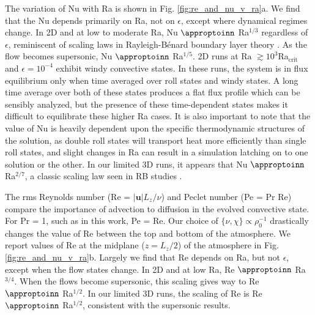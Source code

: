 \documentclass[aps, prl, twocolumn, nofootinbib, groupedaddress, amsfonts, amssymb, amsmath]{revtex4-1}
\newcommand{\RB}{Rayleigh-B\'{e}nard }
\newcommand{\approptoinn}[2]{\mathrel{\vcenter{
	\offinterlineskip\halign{\hfil$##$\cr
	#1\propto\cr\noalign{\kern2pt}#1\sim\cr\noalign{\kern-2pt}}}}}
\newcommand{\appropto}{\mathpalette\approptoinn\relax}
\begin{document}
The variation of Nu with Ra is shown in 
Fig. \ref{fig:re_and_nu_v_ra}a.  We find that the Nu depends primarily
on Ra, not on $\epsilon$, except where dynamical regimes change.
In 2D and at low to moderate Ra, 
Nu $\appropto$ Ra$^{1/3}$ regardless of $\epsilon$,
reminiscent of scaling laws in \RB boundary layer theory 
\cite{grossman&lohse2000, ahlers&all2009}.
As the flow becomes supersonic,  Nu $\appropto$ Ra$^{1/5}$.
2D runs at $\text{Ra }\gtrsim 10^3$Ra$_{\text{crit}}$
and $\epsilon = 10^{-4}$ exhibit windy convective states.
In these runs, the system is in flux equilibrium only when
time averaged over roll states and windy states.
A long time average
over both of these states produces a flat flux profile which
can be sensibly analyzed, but the presence of these time-dependent states
makes it difficult to equilibrate these higher Ra cases.
It is also important to note that
the value of Nu is heavily dependent upon the specific thermodynamic
structures of the solution, as double roll states will transport
heat more efficiently than single roll states, and slight changes in
Ra can result in a simulation latching on to one solution or the other.
In our limited 3D runs, it appears that Nu $\appropto$ Ra$^{2/7}$, a classic scaling law
seen in RB studies \cite{johnston&doering2009}.

The rms Reynolds number (Re = $|\bm{u}|L_z/\nu$) and Peclet number
(Pe = Pr Re)
compare the importance of advection to diffusion in the evolved
convective state.  For Pr = 1, such as in this work, Pe = Re.  
Our choice of $\{\nu,\chi\}\propto \rho_0^{-1}$ drastically changes
the value of Re between the top and bottom of the atmosphere.  We report values of
Re at the midplane ($z=L_z/2$) of the atmosphere in
Fig. \ref{fig:re_and_nu_v_ra}b.  Largely we find that Re
depends on Ra, but not $\epsilon$, except when the flow states
change.
In 2D and at low Ra, Re $\appropto$ Ra$^{3/4}$.  When the flows
become supersonic, 
this scaling gives way to Re $\appropto$ Ra$^{1/2}$.
In our limited 3D runs, the scaling of Re is
Re $\appropto$ Ra$^{1/2}$, consistent with the supersonic results.
\end{document}

